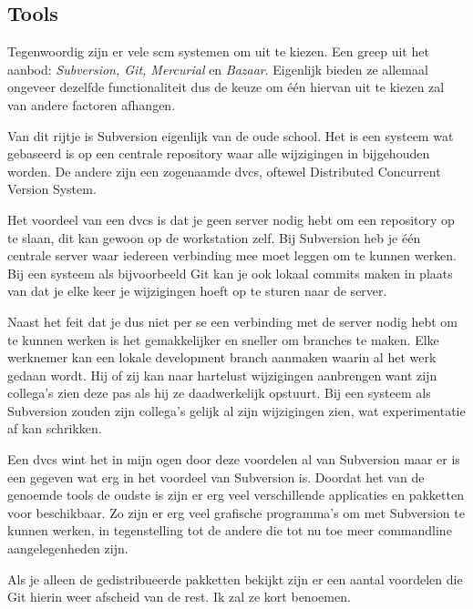 \subsection{Tools}

Tegenwoordig zijn er vele {\sc scm} systemen om uit te kiezen. Een greep uit het aanbod: \emph{Subversion, Git, Mercurial} en \emph{Bazaar}. Eigenlijk bieden ze allemaal ongeveer dezelfde functionaliteit dus de keuze om \'{e}\'{e}n hiervan uit te kiezen zal van andere factoren afhangen.

Van dit rijtje is Subversion eigenlijk van de oude school. Het is een systeem wat gebaseerd is op een centrale repository waar alle wijzigingen in bijgehouden worden. De andere zijn een zogenaamde {\sc dvcs}, oftewel Distributed Concurrent Version System.

Het voordeel van een {\sc dvcs} is dat je geen server nodig hebt om een repository op te slaan, dit kan gewoon op de workstation zelf. Bij Subversion heb je \'{e}\'{e}n centrale server waar iedereen verbinding mee moet leggen om te kunnen werken. Bij een systeem als bijvoorbeeld Git kan je ook lokaal commits maken in plaats van dat je elke keer je wijzigingen hoeft op te sturen naar de server. 

Naast het feit dat je dus niet per se een verbinding met de server nodig hebt om te kunnen werken is het gemakkelijker en sneller om branches te maken. Elke werknemer kan een lokale development branch aanmaken waarin al het werk gedaan wordt. Hij of zij kan naar hartelust wijzigingen aanbrengen want zijn collega's zien deze pas als hij ze daadwerkelijk opstuurt. Bij een systeem als Subversion zouden zijn collega's gelijk al zijn wijzigingen zien, wat experimentatie af kan schrikken.

Een {\sc dvcs} wint het in mijn ogen door deze voordelen al van Subversion maar er is een gegeven wat erg in het voordeel van Subversion is. Doordat het van de genoemde tools de oudste is zijn er erg veel verschillende applicaties en pakketten voor beschikbaar. Zo zijn er erg veel grafische programma's om met Subversion te kunnen werken, in tegenstelling tot de andere die tot nu toe meer commandline aangelegenheden zijn.

Als je alleen de gedistribueerde pakketten bekijkt zijn er een aantal voordelen die Git hierin weer afscheid van de rest. Ik zal ze kort benoemen.

